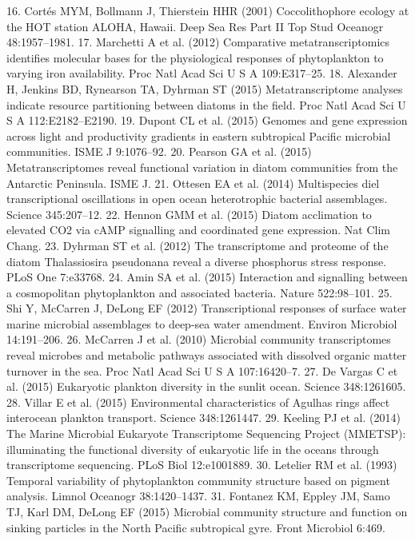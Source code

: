 16. 	Cortés MYM, Bollmann J, Thierstein HHR (2001) Coccolithophore ecology at the HOT station ALOHA, Hawaii. Deep Sea Res Part II Top Stud Oceanogr 48:1957–1981.
17. 	Marchetti A et al. (2012) Comparative metatranscriptomics identifies molecular bases for the physiological responses of phytoplankton to varying iron availability. Proc Natl Acad Sci U S A 109:E317–25.
18. 	Alexander H, Jenkins BD, Rynearson TA, Dyhrman ST (2015) Metatranscriptome analyses indicate resource partitioning between diatoms in the field. Proc Natl Acad Sci U S A 112:E2182–E2190.
19. 	Dupont CL et al. (2015) Genomes and gene expression across light and productivity gradients in eastern subtropical Pacific microbial communities. ISME J 9:1076–92.
20. 	Pearson GA et al. (2015) Metatranscriptomes reveal functional variation in diatom communities from the Antarctic Peninsula. ISME J.
21. 	Ottesen EA et al. (2014) Multispecies diel transcriptional oscillations in open ocean heterotrophic bacterial assemblages. Science 345:207–12.
22. 	Hennon GMM et al. (2015) Diatom acclimation to elevated CO2 via cAMP signalling and coordinated gene expression. Nat Clim Chang.
23. 	Dyhrman ST et al. (2012) The transcriptome and proteome of the diatom Thalassiosira pseudonana reveal a diverse phosphorus stress response. PLoS One 7:e33768.
24. 	Amin SA et al. (2015) Interaction and signalling between a cosmopolitan phytoplankton and associated bacteria. Nature 522:98–101.
25. 	Shi Y, McCarren J, DeLong EF (2012) Transcriptional responses of surface water marine microbial assemblages to deep-sea water amendment. Environ Microbiol 14:191–206.
26. 	McCarren J et al. (2010) Microbial community transcriptomes reveal microbes and metabolic pathways associated with dissolved organic matter turnover in the sea. Proc Natl Acad Sci U S A 107:16420–7.
27. 	De Vargas C et al. (2015) Eukaryotic plankton diversity in the sunlit ocean. Science 348:1261605.
28. 	Villar E et al. (2015) Environmental characteristics of Agulhas rings affect interocean plankton transport. Science 348:1261447.
29. 	Keeling PJ et al. (2014) The Marine Microbial Eukaryote Transcriptome Sequencing Project (MMETSP): illuminating the functional diversity of eukaryotic life in the oceans through transcriptome sequencing. PLoS Biol 12:e1001889.
30. 	Letelier RM et al. (1993) Temporal variability of phytoplankton community structure based on pigment analysis. Limnol Oceanogr 38:1420–1437.
31. 	Fontanez KM, Eppley JM, Samo TJ, Karl DM, DeLong EF (2015) Microbial community structure and function on sinking particles in the North Pacific subtropical gyre. Front Microbiol 6:469.
